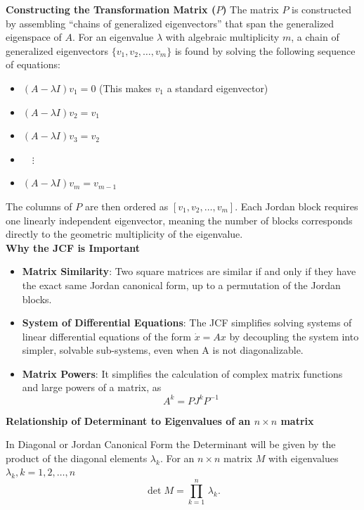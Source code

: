 {\bf Constructing the Transformation Matrix ($P$) }
The matrix $P$ is constructed by assembling ``chains of generalized eigenvectors'' that span the generalized eigenspace of $A$. 
For an eigenvalue $\lambda$ with algebraic multiplicity $m$, a chain of generalized eigenvectors \(\{v_1, v_2, \dots, v_m\}\) is found by solving the following sequence of equations:

\begin{samepage}\begin{itemize}
\item[]\((A - \lambda I)v_1 = 0\) (This makes $v_1$ a standard eigenvector)
\item[]\((A - \lambda I)v_2 = v_1\)
\item[]\((A - \lambda I)v_3 = v_2\)
\item[]\(\quad \vdots\)
\item[]\((A - \lambda I)v_m = v_{m-1}\)
\end{itemize}
\end{samepage}

The columns of $P$ are then ordered as \([v_1, v_2, \dots, v_m]\). Each Jordan block requires one linearly independent eigenvector, meaning the number of blocks corresponds directly to the geometric multiplicity of the eigenvalue.\\

{\bf Why the JCF is Important}
\begin{itemize}
\item[]{\bf Matrix Similarity}: Two square matrices are similar if and only if they have the exact same Jordan canonical form, up to a permutation of the Jordan blocks.
\item[]{\bf System of Differential Equations}: The JCF simplifies solving systems of linear differential equations of the form $\dot{x} = Ax$ by decoupling the system into simpler, solvable sub-systems, even when A is not diagonalizable.
\item[]{\bf Matrix Powers}: It simplifies the calculation of complex matrix functions and large powers of a matrix, as \[A^k = P J^k P^{-1}\]
\end{itemize}

{\bf Relationship of Determinant to Eigenvalues of an $n \times n$ matrix}

In Diagonal or Jordan Canonical Form the Determinant will be given by the product of the diagonal elements $\lambda_k$. For an $n \times n$ matrix $M$ with eigenvalues $\lambda_k, k = 1, 2, \hdots, n$
\[ \det M = \prod_{k = 1}^n \, \lambda_k.\]